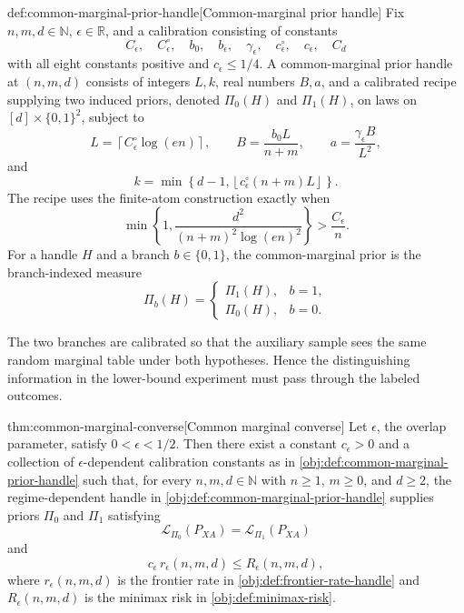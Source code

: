 \begin{definitionv}{def:common-marginal-prior-handle}[Common-marginal prior handle]
Fix \(n,m,d\in\mathbb N\), \(\epsilon\in\mathbb R\), and a calibration consisting of constants
\[
C_\epsilon,\quad C_\epsilon^\circ,\quad b_0,\quad b_\epsilon,\quad
\gamma_\epsilon,\quad c_\epsilon^\circ,\quad c_\epsilon,\quad C_d
\]
with all eight constants positive and \(c_\epsilon\le 1/4\).  A common-marginal prior handle at \((n,m,d)\) consists of integers \(L,k\), real numbers \(B,a\), and a calibrated recipe supplying two induced priors, denoted \(\Pi_0(H)\) and \(\Pi_1(H)\), on laws on \([d]\times\{0,1\}^2\), subject to
\[
L=\left\lceil C_\epsilon^\circ \log(en)\right\rceil,\qquad
B=\frac{b_0L}{n+m},\qquad
a=\frac{\gamma_\epsilon B}{L^2},
\]
and
\[
k=\min\left\{d-1,\left\lfloor c_\epsilon^\circ(n+m)L\right\rfloor\right\}.
\]
The recipe uses the finite-atom construction exactly when
\[
\min\left\{1,\frac{d^2}{(n+m)^2\log(en)^2}\right\}
>
\frac{C_\epsilon}{n}.
\]
For a handle \(H\) and a branch \(b\in\{0,1\}\), the common-marginal prior is the branch-indexed measure
\[
\Pi_b(H)=
\begin{cases}
\Pi_1(H), & b=1,\\
\Pi_0(H), & b=0.
\end{cases}
\]
\end{definitionv}

The two branches  are calibrated so that the auxiliary sample sees the same random marginal table under both hypotheses. Hence the distinguishing information in the lower-bound experiment must pass through the labeled outcomes.

\begin{theoremv}{thm:common-marginal-converse}[Common marginal converse]
Let \(\epsilon\), the overlap parameter, satisfy \(0<\epsilon<1/2\).  Then there exist a constant \(c_\epsilon>0\) and a collection of \(\epsilon\)-dependent calibration constants as in \cref{obj:def:common-marginal-prior-handle} such that, for every \(n,m,d\in\mathbb N\) with \(n\ge1\), \(m\ge0\), and \(d\ge2\), the regime-dependent handle in \cref{obj:def:common-marginal-prior-handle} supplies priors \(\Pi_0\) and \(\Pi_1\) satisfying
\[
\mathcal L_{\Pi_0}(P_{XA})=\mathcal L_{\Pi_1}(P_{XA})
\]
and
\[
c_\epsilon\, r_\epsilon(n,m,d)\le R_\epsilon(n,m,d),
\]
where \(r_\epsilon(n,m,d)\) is the frontier rate in \cref{obj:def:frontier-rate-handle} and \(R_\epsilon(n,m,d)\) is the minimax risk in \cref{obj:def:minimax-risk}.
\end{theoremv}

